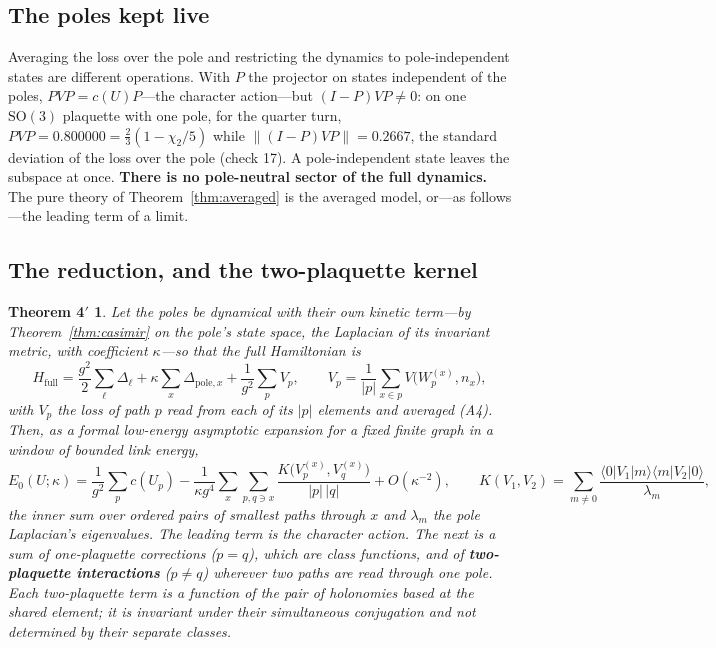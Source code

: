 \documentclass[11pt,a4paper]{article}
\theoremstyle{plain}
\newtheorem*{theorem4p}{Theorem 4$'$}
\theoremstyle{definition}
\theoremstyle{remark}
\newcommand{\SO}{\mathrm{SO}}
\begin{document}
\subsection{The poles kept live}

Averaging the loss over the pole and restricting the dynamics to pole-independent states are different operations. With $P$ the projector on states independent of the poles, $PVP=c(U)P$---the character action---but $(I-P)VP\neq0$: on one $\SO(3)$ plaquette with one pole, for the quarter turn, $PVP=0.800000=\tfrac23(1-\chi_2/5)$ while $\|(I-P)VP\|=0.2667$, the standard deviation of the loss over the pole (check 17). A pole-independent state leaves the subspace at once. \textbf{There is no pole-neutral sector of the full dynamics.} The pure theory of Theorem~\ref{thm:averaged} is the averaged model, or---as follows---the leading term of a limit.

\subsection{The reduction, and the two-plaquette kernel}

\begin{theorem4p}
Let the poles be dynamical with their own kinetic term---by Theorem~\ref{thm:casimir} on the pole's state space, the Laplacian of its invariant metric, with coefficient $\kappa$---so that the full Hamiltonian is
\begin{equation}
H_{\mathrm{full}}=\frac{g^2}{2}\sum_\ell\Delta_\ell+\kappa\sum_x\Delta_{\mathrm{pole},x}+\frac{1}{g^2}\sum_pV_p,\qquad V_p=\frac{1}{|p|}\sum_{x\in p}V\big(W_p^{(x)},n_x\big),
\end{equation}
with $V_p$ the loss of path $p$ read from each of its $|p|$ elements and averaged (A4). Then, as a formal low-energy asymptotic expansion for a fixed finite graph in a window of bounded link energy,
\begin{equation}
E_0(U;\kappa)=\frac{1}{g^2}\sum_pc(U_p)-\frac{1}{\kappa g^4}\sum_x\sum_{p,q\ni x}\frac{K\big(V_p^{(x)},V_q^{(x)}\big)}{|p|\,|q|}+O(\kappa^{-2}),\qquad
K(V_1,V_2)=\sum_{m\neq0}\frac{\langle0|V_1|m\rangle\langle m|V_2|0\rangle}{\lambda_m},
\end{equation}
the inner sum over ordered pairs of smallest paths through $x$ and $\lambda_m$ the pole Laplacian's eigenvalues. The leading term is the character action. The next is a sum of one-plaquette corrections ($p=q$), which are class functions, and of \textbf{two-plaquette interactions} ($p\neq q$) wherever two paths are read through one pole. Each two-plaquette term is a function of the pair of holonomies based at the shared element; it is invariant under their simultaneous conjugation and not determined by their separate classes.
\end{theorem4p}
\end{document}
